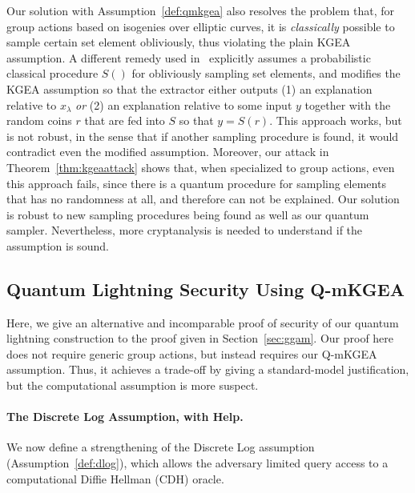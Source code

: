 \documentclass{article}\usepackage[a4paper,margin=20mm]{geometry}
\numberwithin{theorem}{section}
\numberwithin{equation}{section}
\begin{document}
\begin{remark}Our solution with Assumption~\ref{def:qmkgea} also resolves the problem that, for group actions based on isogenies over elliptic curves, it is \emph{classically} possible to sample certain set element obliviously, thus violating the plain KGEA assumption. A different remedy used in~\cite{EC:LiuMonZha23} explicitly assumes a probabilistic classical procedure $S()$ for obliviously sampling set elements, and modifies the KGEA assumption so that the extractor either outputs (1) an explanation relative to $x_\lambda$ \emph{or} (2) an explanation relative to some input $y$ together with the random coins $r$ that are fed into $S$ so that $y=S(r)$. This approach works, but is not robust, in the sense that if another sampling procedure is found, it would contradict even the modified assumption. Moreover, our attack in Theorem~\ref{thm:kgeaattack} shows that, when specialized to group actions, even this approach fails, since there is a quantum procedure for sampling elements that has no randomness at all, and therefore can not be explained. Our solution is robust to new sampling procedures being found as well as our quantum sampler. Nevertheless, more cryptanalysis is needed to understand if the assumption is sound.
\end{remark}





\subsection{Quantum Lightning Security Using Q-mKGEA}\label{sec:security}

Here, we give an alternative and incomparable proof of security of our quantum lightning construction to the proof given in Section~\ref{sec:ggam}. Our proof here does not require generic group actions, but instead requires our Q-mKGEA assumption. Thus, it achieves a trade-off by giving a standard-model justification, but the computational assumption is more suspect.



\paragraph{The Discrete Log Assumption, with Help.} We now define a strengthening of the Discrete Log assumption (Assumption~\ref{def:dlog}), which allows the adversary limited query access to a computational Diffie Hellman (CDH) oracle. 
\end{document}
